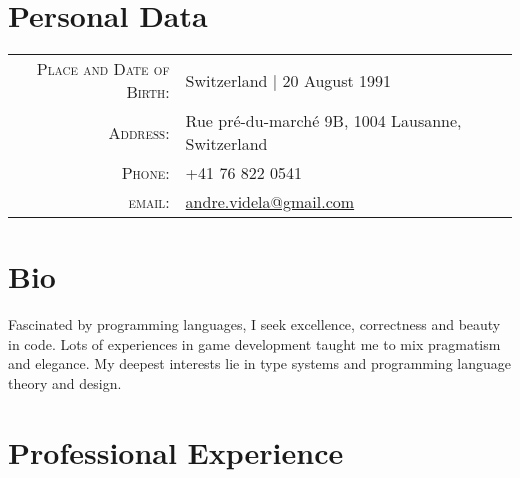\documentclass[a4paper,10pt]{article} %
\begin{document}
\pagestyle{empty} %


\par{\bigskip\par} %
\par{\bigskip\par} %
\section{Personal Data}

\begin{tabular}{rl}
\textsc{Place and Date of Birth:} & Switzerland  | 20 August 1991 \\
\textsc{Address:} & Rue pré-du-marché 9B, 1004 Lausanne, Switzerland \\
\textsc{Phone:} & +41 76 822 0541\\
\textsc{email:} & \href{mailto:andre.videla@gmail.com}{andre.videla@gmail.com}
\end{tabular}


\section{Bio}
Fascinated by programming languages, I seek excellence, correctness and beauty in code. Lots of experiences in game development taught me to mix pragmatism and elegance. My deepest interests lie in type systems and programming language theory and design.


\section{Professional Experience}
\end{document}
